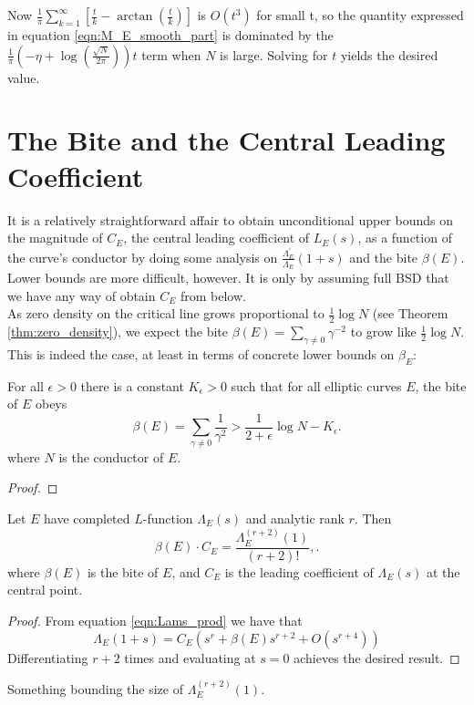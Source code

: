 \documentclass[10pt]{article}
\newcommand{\pr}{^{\prime}}
\newcommand{\Les}{L_E(s)}
\newcommand{\Lams}{\Lambda_E(s)}
\newcommand{\ldLam}[1]{\frac{\Lambda_E\pr}{\Lambda_E}\left(#1\right)}
\begin{document}
Now $\frac{1}{\pi}\sum_{k=1}^{\infty} \left[\frac{t}{k} - \arctan\left(\frac{t}{k}\right)\right]$ is $O(t^3)$ for small t, so the quantity expressed in equation \ref{eqn:M_E_smooth_part} is dominated by the $\frac{1}{\pi}\left(-\eta+\log\left(\frac{\sqrt{N}}{2\pi}\right)\right) t$ term when $N$ is large. Solving for $t$ yields the desired value.

\newpage
\section{The Bite and the Central Leading Coefficient}

It is a relatively straightforward affair to obtain unconditional upper bounds on the magnitude of $C_E$, the central leading coefficient of $\Les$, as a function of the curve's conductor by doing some analysis on $\ldLam{1+s}$ and the bite $\beta(E)$. Lower bounds are more difficult, however. It is only by assuming full BSD that we have any way of obtain $C_E$ from below. \\

As zero density on the critical line grows proportional to $\frac{1}{2}\log N$ (see Theorem \ref{thm:zero_density}), we expect the bite $\beta(E) = \sum_{\gamma\ne 0} \gamma^{-2}$ to grow like $\frac{1}{2}\log N$. This is indeed the case, at least in terms of concrete lower bounds on $\beta_E$:
\begin{lemma}[S.]
For all $\epsilon>0$ there is a constant $K_{\epsilon}>0$ such that for all elliptic curves $E$, the bite of $E$ obeys
\begin{equation}
\beta(E) = \sum_{\gamma\ne 0} \frac{1}{\gamma^2} > \frac{1}{2+\epsilon} \log N - K_{\epsilon}.
\end{equation}
where $N$ is the conductor of $E$.
\end{lemma}
\begin{proof}

\end{proof}

\begin{proposition}
Let $E$ have completed $L$-function $\Lams$ and analytic rank $r$. Then
\begin{equation}
\beta(E)\cdot C_E = \frac{\Lambda_E^{(r+2)}(1)}{(r+2)!},.
\end{equation}
where $\beta(E)$ is the bite of $E$, and $C_E$ is the leading coefficient of $\Lams$ at the central point.
\end{proposition}
\begin{proof}
From equation \ref{eqn:Lams_prod} we have that 
\begin{equation}
\Lambda_E(1+s) = C_E\left(s^r + \beta(E) s^{r+2} + O(s^{r+4})\right)
\end{equation}
Differentiating $r+2$ times and evaluating at $s=0$ achieves the desired result.
\end{proof}
\begin{corollary}
Something bounding the size of $\Lambda_E^{(r+2)}(1)$.
\end{corollary}
\end{document}

